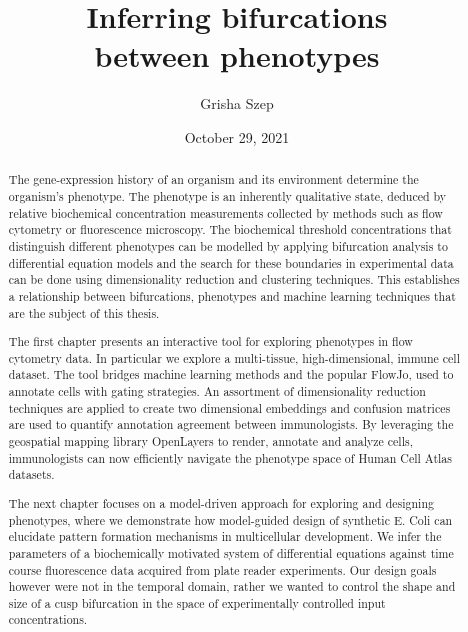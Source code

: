 \title{Inferring bifurcations\\between phenotypes}
\author{Grisha Szep}


\date{October 29, 2021}
\maketitle

\begin{abstract} %

    The gene-expression history of an organism and its environment determine the organism’s phenotype. The phenotype is an inherently qualitative state, deduced by relative biochemical concentration measurements collected by methods such as flow cytometry or fluorescence microscopy. The biochemical threshold concentrations that distinguish different phenotypes can be modelled by applying bifurcation analysis to differential equation models and the search for these boundaries in experimental data can be done using dimensionality reduction and clustering techniques. This establishes a relationship between bifurcations, phenotypes and machine learning techniques that are the subject of this thesis.

    The first chapter presents an interactive tool for exploring phenotypes in flow cytometry data. In particular we explore a multi-tissue, high-dimensional, immune cell dataset. The tool bridges machine learning methods and the popular FlowJo, used to annotate cells with gating strategies. An assortment of dimensionality reduction techniques are applied to create two dimensional embeddings and confusion matrices are used to quantify annotation agreement between immunologists. By leveraging the geospatial mapping library OpenLayers to render, annotate and analyze cells, immunologists can now efficiently navigate the phenotype space of Human Cell Atlas datasets.
    
    The next chapter focuses on a model-driven approach for exploring and designing phenotypes, where we demonstrate how model-guided design of synthetic E. Coli can elucidate pattern formation mechanisms in multicellular development. We infer the parameters of a biochemically motivated system of differential equations against time course fluorescence data acquired from plate reader experiments. Our design goals however were not in the temporal domain, rather we wanted to control the shape and size of a cusp bifurcation in the space of experimentally controlled input concentrations.
    

\end{abstract}
